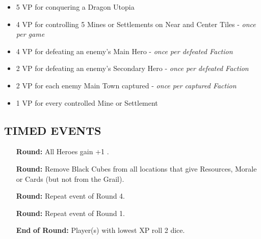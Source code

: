 \begin{multicols*}{2}
\begin{itemize}
 \item 5 VP for conquering a Dragon Utopia
 \item 4 VP for controlling 5 Mines or Settlements on Near and Center Tiles - \textit{once per game}
 \item 4 VP for defeating an enemy's Main Hero - \textit{once per defeated Faction}
 \item 2 VP for defeating an enemy's Secondary Hero - \textit{once per defeated Faction}
 \item 2 VP for each enemy Main Town captured - \textit{once per captured Faction}
 \item 1 VP for every controlled Mine or Settlement
\end{itemize}

\subsection*{\MakeUppercase{Timed Events}}

\begin{itemize}
  \item[\textbf{\nth{1}}] \textbf{Round:} All Heroes gain +1 .
  \item[\textbf{\nth{4}}] \textbf{Round:} Remove Black Cubes from all locations that give Resources, Morale or Cards (but not from the Grail).
  \item[\textbf{\nth{8}}] \textbf{Round:} Repeat event of Round 4.
  \item[\textbf{\nth{9}}] \textbf{Round:} Repeat event of Round 1.
  \item[\textbf{End}] \textbf{of  Round:} Player(s) with lowest XP roll 2  dice.
\end{itemize}


\end{multicols*}
